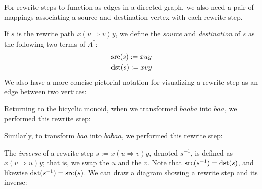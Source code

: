 \documentclass[../generics]{subfiles}
\begin{document}
For rewrite steps to function as edges in a directed graph, we also need a pair of mappings associating a source and destination vertex with each rewrite step.
\begin{definition}
If $s$ is the rewrite path $x(u\Rightarrow v)y$, we define the \emph{source} and \emph{destination} of $s$ as the following two terms of $A^*$:
\begin{gather*}
\operatorname{src}(s) := xuy\\
\operatorname{dst}(s) := xvy
\end{gather*}
We also have a more concise pictorial notation for visualizing a rewrite step as an edge between two vertices:
\begin{quote}
\end{quote}
\end{definition}
\begin{example}
Returning to the bicyclic monoid, when we transformed $baaba$ into $baa$, we performed this rewrite step:
\begin{quote}
\end{quote}
Similarly, to transform $baa$ into $babaa$, we performed this rewrite step:
\begin{quote}
\end{quote}
\end{example}
\begin{definition}
The \emph{inverse} of a rewrite step $s:=x(u\Rightarrow v)y$, denoted $s^{-1}$, is defined as $x(v\Rightarrow u)y$; that is, we swap the $u$ and the $v$. Note that $\operatorname{src}(s^{-1})=\operatorname{dst}(s)$, and likewise $\operatorname{dst}(s^{-1})=\operatorname{src}(s)$. We can draw a diagram showing a rewrite step and its inverse:
\begin{quote}
\end{quote}
\end{definition}
\end{document}
